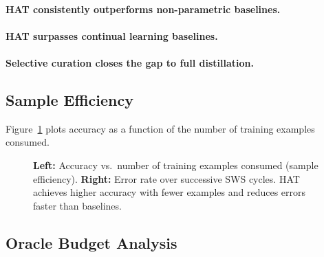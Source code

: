 
\paragraph{HAT consistently outperforms non-parametric baselines.}

\paragraph{HAT surpasses continual learning baselines.}

\paragraph{Selective curation closes the gap to full distillation.}

\subsection{Sample Efficiency}
\label{sec:results:efficiency}

Figure~\ref{fig:sample_efficiency} plots accuracy as a function of the number of training examples consumed.

\begin{figure}[t]
  \centering
  \hfill
  \caption{\textbf{Left:} Accuracy vs.\ number of training examples consumed (sample efficiency). \textbf{Right:} Error rate over successive SWS cycles.  HAT achieves higher accuracy with fewer examples and reduces errors faster than baselines.}
  \label{fig:sample_efficiency}
\end{figure}


\subsection{Oracle Budget Analysis}
\label{sec:results:oracle}

